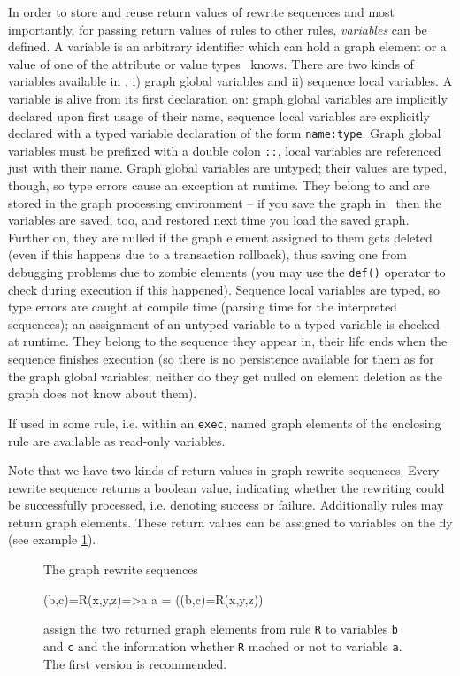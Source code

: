 In order to store and reuse return values of rewrite sequences and most importantly, 
for passing return values of rules to other rules, \emph{variables} can be defined.
A variable is an arbitrary identifier which can hold a graph element or a value of one of the attribute or value types \GrG\ knows.
There are two kinds of variables available in \GrG,
i) graph global variables and 
ii) sequence local variables.
A variable is alive from its first declaration on: graph global variables are implicitly declared upon first usage of their name,
sequence local variables are explicitly declared with a typed variable declaration of the form \texttt{name:type}.
Graph global variables must be prefixed with a double colon \texttt{::}, local variables are referenced just with their name.
Graph global variables are untyped; their values are typed, though, so type errors cause an exception at runtime.
They belong to and are stored in the graph processing environment -- if you save the graph in \GrShell\ 
then the variables are saved, too, and restored next time you load the saved graph.
Further on, they are nulled if the graph element assigned to them gets deleted (even if this happens due to a transaction rollback),
thus saving one from debugging problems due to zombie elements (you may use the \texttt{def()} operator to check during execution if this happened).
Sequence local variables are typed, so type errors are caught at compile time (parsing time for the interpreted sequences); 
an assignment of an untyped variable to a typed variable is checked at runtime.
They belong to the sequence they appear in, their life ends when the sequence finishes execution 
(so there is no persistence available for them as for the graph global variables; neither do they get nulled on element deletion as the graph does not know about them). 

If used in some rule, i.e. within an \texttt{exec}, named graph elements of the enclosing rule are available as read-only variables.

Note that we have two kinds of return values in graph rewrite sequences.
Every rewrite sequence returns a boolean value, indicating whether the rewriting could be successfully processed, i.e. denoting success or failure.
Additionally rules may return graph elements.
These return values can be assigned to variables on the fly (see example \ref{ex:grsreturn}).
\begin{figure}[htbp]
\begin{example}
	\label{ex:grsreturn}
The graph rewrite sequences
	\begin{grgen}	 
(b,c)=R(x,y,z)=>a
a = ((b,c)=R(x,y,z))
	\end{grgen}
assign the two returned graph elements from rule \texttt{R} to variables \texttt{b} and \texttt{c} and the information whether \texttt{R} mached or not to variable \texttt{a}. The first version is recommended.
\end{example}
\end{figure}


